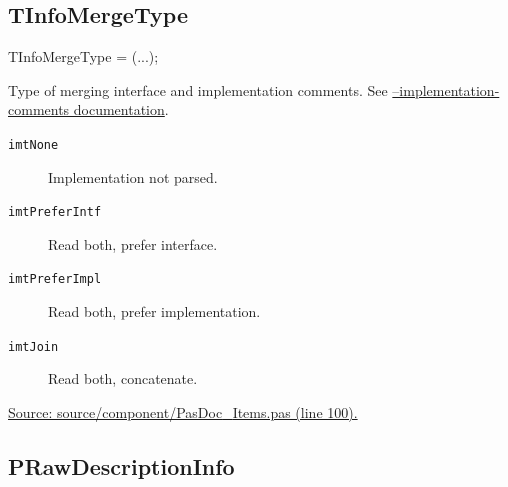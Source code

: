 \documentclass{report}
\newif\ifpdf
\begin{document}
\subsection*{TInfoMergeType}
\fi
\label{PasDoc_Items-TInfoMergeType}
\begin{list}{}{
\setlength{\itemindent}{0cm}
\setlength{\listparindent}{0cm}
\setlength{\leftmargin}{\evensidemargin}
\addtolength{\leftmargin}{\tmplength}
\settowidth{\labelsep}{X}
\addtolength{\leftmargin}{\labelsep}
\setlength{\labelwidth}{\tmplength}
}
\item[\textbf{Declaration}\hfill]
\ifpdf
\begin{flushleft}
\fi
\begin{ttfamily}
TInfoMergeType = (...);\end{ttfamily}

\ifpdf
\end{flushleft}
\fi

\par
\item[\textbf{Description}]
Type of merging interface and implementation comments. See \href{https://pasdoc.github.io/ImplementationCommentsOption}{--implementation-comments documentation}.\item[\textbf{Values}]
\begin{description}
\item[\texttt{imtNone}] \label{PasDoc_Items-imtNone}
\index{}
Implementation not parsed.
\item[\texttt{imtPreferIntf}] \label{PasDoc_Items-imtPreferIntf}
\index{}
Read both, prefer interface.
\item[\texttt{imtPreferImpl}] \label{PasDoc_Items-imtPreferImpl}
\index{}
Read both, prefer implementation.
\item[\texttt{imtJoin}] \label{PasDoc_Items-imtJoin}
\index{}
Read both, concatenate.
\end{description}
\par
\href{https://github.com/pasdoc/pasdoc/blob/master/source/component/PasDoc_Items.pas#L100}{Source: source/component/PasDoc{\_}Items.pas (line 100).}

\end{list}
\ifpdf
\subsection*{\large{\textbf{PRawDescriptionInfo}}\normalsize\hspace{1ex}\hrulefill}
\else
\end{document}
